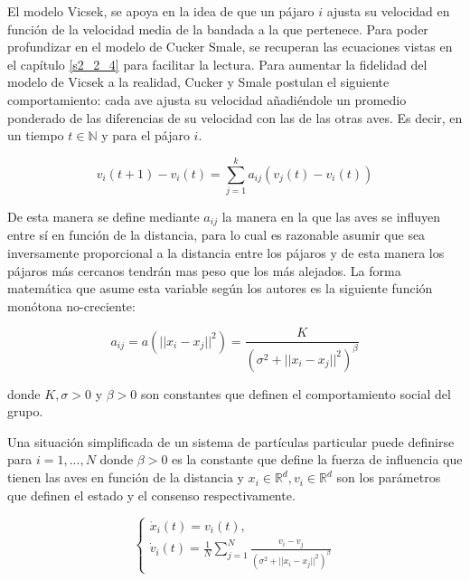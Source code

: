 El modelo Vicsek, se apoya en la idea de que un pájaro $i$ ajusta su velocidad en función de la velocidad media de la bandada a la que pertenece. Para poder profundizar en el modelo de Cucker Smale, se recuperan las ecuaciones vistas en el capítulo \ref{s2_2_4} para facilitar la lectura. Para aumentar la fidelidad del modelo de Vicsek a la realidad, Cucker y Smale postulan el siguiente comportamiento: cada ave ajusta su velocidad añadiéndole un promedio ponderado de las diferencias de su velocidad con las de las otras aves. Es decir, en un tiempo $t \in \mathbb N$  y para el pájaro $i$.

\begin{equation}\label{eq:CS1}
    v_{i}(t+1)-v_i(t)=\sum_{j=1}^{k} a_{ij}(v_{j}(t)-v_{i}(t))
\end{equation}

De esta manera se define mediante $a_{ij}$ la manera en la que las aves se influyen entre sí en función de la distancia, para lo cual es razonable asumir que sea inversamente proporcional a la distancia entre los pájaros y de esta manera los pájaros más cercanos tendrán mas peso que los más alejados. La forma matemática que asume esta variable según los autores es la siguiente función monótona no-creciente:

\begin{equation}\label{eq:CS2-aij}
    a_{ij} = a(||x_{i}-x_{j}||^2) = \frac{K}{(\sigma^2 +||x_{i}-x_{j}||^2)^\beta}
\end{equation}

\noindent donde $K,\sigma>0$ y $\beta>0$ son constantes que definen el comportamiento social del grupo. 

Una situación simplificada de un sistema de partículas particular puede definirse para $i = 1,...,N$ donde $\beta > 0$ es la constante que define la fuerza de influencia que tienen las aves en función de la distancia y $x_i \in \mathbb{R}^d, v_i \in \mathbb{R}^d$ son los parámetros que definen el estado y el consenso respectivamente. 

\begin{equation}\label{eq:CS5GeneralBeta} 
    \left\lbrace
    \begin{array}{ll}
        \dot{x}_{i}(t)=v_{i}(t) ,\\
        \dot{v}_{i}(t)= \displaystyle{\frac{1}{N}\sum_{j=1}^{N}\frac{v_{i}-v_{j}}{(\sigma^2+||x_{i}-x_{j}||^2)^\beta}}
    \end{array}
    \right.
\end{equation}

